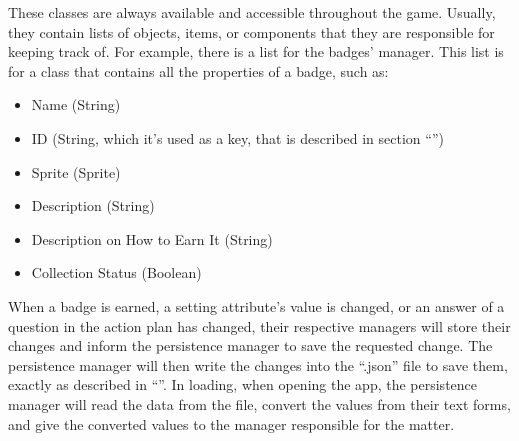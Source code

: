 These classes are always available and accessible throughout the game. Usually, they contain lists of objects, items, or components that they are responsible for keeping track of. For example, there is a list for the badges' manager. This list is for a class that contains all the properties of a badge, such as:
\begin{itemize}
\item{Name (String)}
\item{ID (String, which it's used as a key, that is described in section “\textbf{}”)}
\item{Sprite (Sprite)}
\item{Description (String)}
\item{Description on How to Earn It (String)}
\item{Collection Status (Boolean)}
\end{itemize}

When a badge is earned, a setting attribute's value is changed, or an answer of a question in the action plan has changed, their respective managers will store their changes and inform the persistence manager to save the requested change. The persistence manager will then write the changes into the “.json” file to save them, exactly as described in “\textbf{}”. In loading, when opening the app, the persistence manager will read the data from the file, convert the values from their text forms, and give the converted values to the manager responsible for the matter.

